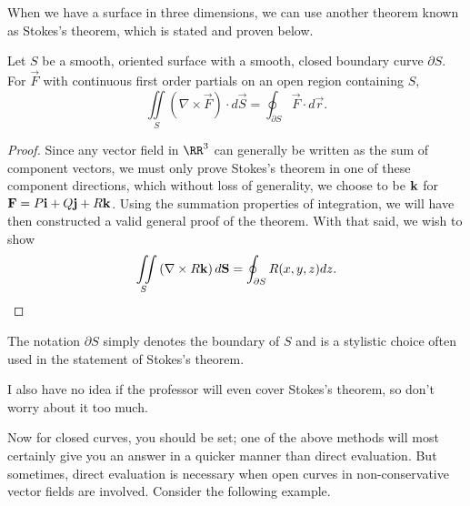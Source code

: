 When we have a surface in three dimensions, we can use another theorem known as Stokes's theorem, which is stated and proven below.

\begin{theorem}
    Let $S$ be a smooth, oriented surface with a smooth, closed boundary curve $\partial S$. For $\vec{F}$ with continuous first order partials on an open region containing $S$,
    \[\iint\limits_{S}\left(\nabla \times \vec{F}\right) \cdot d\vec{S} = \oint_{\partial S}\vec{F} \cdot d\vec{r}.\]
\end{theorem}

\begin{proof}
    Since any vector field in $\RR^{3}$ can generally be written as the sum of component vectors, we must only prove Stokes's theorem in one of these component directions, which without loss of generality, we choose to be $\mathbf{k}$ for $\mathbf{F} = P\mathbf{i} + Q\mathbf{j} + R\mathbf{k}$. Using the summation properties of integration, we will have then constructed a valid general proof of the theorem. With that said, we wish to show
    \[\iint\limits_{S}\left(\nabla \times R\mathbf{k}\right)d\mathbf{S} = \oint_{\partial S}R(x, y, z)dz.\]
\end{proof}

\begin{remark}
    The notation $\partial S$ simply denotes the boundary of $S$ and is a stylistic choice often used in the statement of Stokes's theorem.
\end{remark}

\begin{remark}
    I also have no idea if the professor will even cover Stokes's theorem, so don't worry about it too much.
\end{remark}

Now for closed curves, you should be set; one of the above methods will most certainly give you an answer in a quicker manner than direct evaluation. But sometimes, direct evaluation is necessary when open curves in non-conservative vector fields are involved. Consider the following example.

